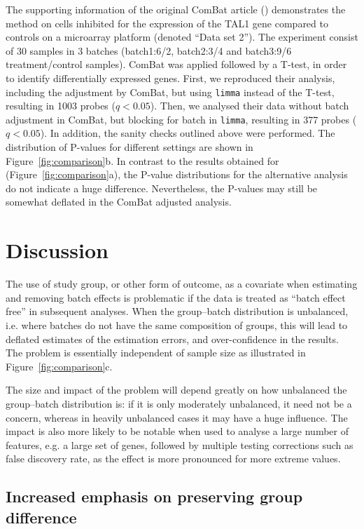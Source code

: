 \documentclass{bio}
\begin{document}
The supporting information of the original ComBat article (\citealp{Johnson2007}) demonstrates the method on cells inhibited for the expression of the TAL1 gene compared to controls on a microarray platform (denoted ``Data set 2''). The experiment consist of 30 samples in 3 batches (batch1:6/2, batch2:3/4 and batch3:9/6 treatment/control samples). ComBat was applied followed by a T-test, in order to identify differentially expressed genes. First, we reproduced their analysis, including the adjustment by ComBat, but using \texttt{limma} instead of the T-test, resulting in 1003 probes ($q<0.05$).  Then, we analysed their data without batch adjustment in ComBat, but blocking for batch in \texttt{limma}, resulting in 377 probes ($q<0.05$). In addition, the sanity checks outlined above were performed. The distribution of P-values for different settings are shown in Figure~\ref{fig:comparison}b. In contrast to the results obtained for \citet{Towfic2014} (Figure~\ref{fig:comparison}a), the P-value distributions for the alternative analysis do not indicate a huge difference. Nevertheless, the P-values may still be somewhat deflated in the ComBat adjusted analysis.


\section{Discussion}

The use of study group, or other form of outcome, as a covariate when estimating and removing batch effects is problematic if the data is treated as ``batch effect free'' in subsequent analyses. When the group--batch distribution is unbalanced, i.e. where batches do not have the same composition of groups, this will lead to deflated estimates of the estimation errors, and over-confidence in the results. The problem is essentially independent of sample size as illustrated in Figure~\ref{fig:comparison}c.

The size and impact of the problem will depend greatly on how unbalanced the group--batch distribution is: if it is only moderately unbalanced, it need not be a concern, whereas in heavily unbalanced cases it may have a huge influence. The impact is also more likely to be notable when used to analyse a large number of features, e.g. a large set of genes, followed by multiple testing corrections such as false discovery rate, as the effect is more pronounced for more extreme values.

\subsection{Increased emphasis on preserving group difference}
\end{document}

